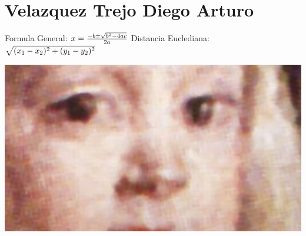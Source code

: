 \chapter{Velazquez Trejo Diego Arturo}

Formula General: 
$ \\ x = \frac{-b\pm\sqrt{b^{2}-4ac}}{2a} \\$
Distancia Euclediana: 
$ \\ \sqrt{(x_1 - x_2)^2 + (y_1 - y_2)^2} \\$

\includegraphics{./317227257/velaske.jpg}
